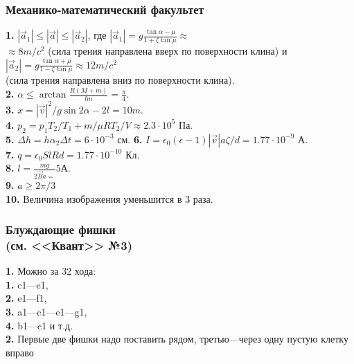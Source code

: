 \begin{multicols}{2}
    \subsubsection*{Механико-математический факультет}
    \textbf{1.} $|\overset{\rightarrow}{a}_1|\leq|\overset{\rightarrow}{a}|\leq|\overset{\rightarrow}{a}_2|$, где $|\overset{\rightarrow}{a}_1|=g\frac{\tan\alpha-\mu}{1+\zeta\tan\mu}\approx$\\
    $\approx8m/c^2$ (сила трения направлена вверх по поверхности клина) и $|\overset{\rightarrow}{a}_2|=g\frac{\tan\alpha+\mu}{1-\zeta\tan\mu}\approx12 m/c^2$\\
    (сила трения направлена вниз по поверхности клина).\\
    \textbf{2.} $\alpha\leq\arctan\frac{R(M+m)}{lm}=\frac{\pi}{4}$.\\
    \textbf{3.} $x=|\overset{\rightarrow}{v}|^2/g\sin2\alpha-2l=10m.$\\
    \textbf{4.} $p_2=p_1T_2/T_1+m/\mu RT_2/V\approx2.3\cdot 10^5$ Па.\\
    \textbf{5.} $\Delta h=h\alpha_2\Delta t=6\cdot 10^{-3}$ см.
    \textbf{6.} $I=\epsilon_0(\epsilon-1)|\overset{\rightarrow}{v}|a\zeta/d=1.77\cdot10^{-9}$ А.\\
    \textbf{7.} $q=\epsilon_0SlRd=1.77\cdot10^{-10}$ Кл.\\
    \textbf{8.} $l=\frac{mg}{2\overset{\rightarrow}{B}a=}5А$.\\
    \textbf{9.} $a\geq2\pi/3$\\
    \textbf{10.} Величина изображения уменьшится в 3 раза.
    \subsubsection*{Блуждающие фишки\\ (см. <<Квант>> №3)}
    \textbf{1.} Можно за 32 хода:\\
    \textbf{1.} c1---e1,\\
    \textbf{2.} e1---f1,\\
    \textbf{3.} a1---c1---e1---g1,\\
    \textbf{4.} b1---c1 и т.д.\\
    \textbf{2.} Первые две фишки надо поставить рядом, третью---через одну пустую клетку вправо
\end{multicols}